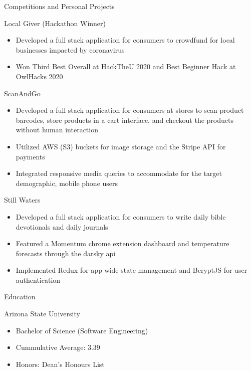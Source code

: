 \documentclass{article}
\newlength{\tabin}
\newlength{\secsep}
\newcommand{\lineunder}{\vspace*{-8pt} \\ \hspace*{-6pt} \hrulefill \\ \vspace*{-15pt}}
\newenvironment{tabbedsection}[1]{
  \begin{list}{}{
      \setlength{\itemsep}{0pt}
      \setlength{\labelsep}{0pt}
      \setlength{\labelwidth}{0pt}
      \setlength{\leftmargin}{\tabin}
      \setlength{\rightmargin}{\tabin}
      \setlength{\listparindent}{0pt}
      \setlength{\parsep}{0pt}
      \setlength{\parskip}{0pt}
      \setlength{\partopsep}{0pt}
      \setlength{\topsep}{#1}
    }
  \item[]
}{\end{list}}
\newenvironment{resume_section}[1]{
  \filbreak
  \vspace{2\secsep}
  \textsc{\large#1}
  \lineunder
  \begin{tabbedsection}{\secsep}
}{\end{tabbedsection}}
\newenvironment{resume_subsection}[2][]{
  \textbf{#2} \hfill {\footnotesize #1} \hspace{2em}
  \begin{tabbedsection}{0.5\secsep}
}{\end{tabbedsection}}
\newenvironment{subitems}{
  \renewcommand{\labelitemi}{-}
  \begin{itemize}
      \setlength{\labelsep}{1em}
}{\end{itemize}}
\begin{document}
\begin{resume_section}{Competitions and Personal Projects}
  \begin{resume_subsection}[(August 2020)]{Local Giver \footnotesize (Hackathon Winner) \parskip}
  \begin{subitems}
    \item Developed a full stack application for consumers to crowdfund for local businesses impacted by coronavirus
    \item Won Third Best Overall at HackTheU 2020 and Best Beginner Hack at OwlHacks 2020
    \end{subitems}
  \end{resume_subsection}


  \begin{resume_subsection}[(November 2020)]{ScanAndGo}
  \begin{subitems}
    \item Developed a full stack application for consumers at stores to scan product barcodes, store products in a cart interface, and checkout the products without human interaction
    \item Utilized AWS (S3) buckets for image storage and the Stripe API for payments
    \item  Integrated responsive media queries to accommodate for the target demographic, mobile phone users
    \end{subitems}
  \end{resume_subsection}



  \begin{resume_subsection}[(September 2020)]{Still Waters}
    \begin{subitems}
        \item Developed a full stack application for consumers to write daily bible devotionals and daily journals
        \item Featured a Momentum chrome extension dashboard and temperature forecasts through the darsky api 
        \item Implemented Redux for app wide state management and BcryptJS for user authentication
    \end{subitems}
  \end{resume_subsection}


\begin{resume_section}{Education}
  \begin{resume_subsection}{Arizona State University}
    \begin{subitems}
      \item Bachelor of Science (Software Engineering)
      \item Cummulative Average: 3.39
      \item Honors: Dean's Honours List
    \end{subitems}
  \end{resume_subsection}
  

\end{resume_section}
\end{resume_section}
\end{document}

